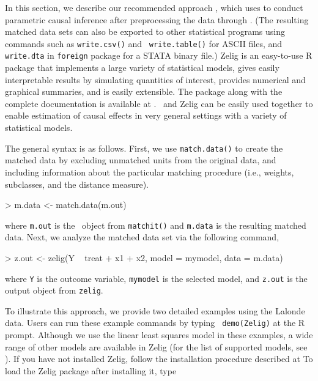 In this section, we describe our recommended approach
\citep{HoImaKin05}, which uses
 to conduct parametric
causal inference after preprocessing the data through \MatchIt.  (The
resulting matched data sets can also be exported to other statistical
programs using commands such as {\tt write.csv()} and {\tt
  write.table()} for ASCII files, and {\tt write.dta} in {\tt foreign}
package for a STATA binary file.)  Zelig \citep{ImaKinLau04} is an
easy-to-use R package that implements a large variety of statistical
models, gives easily interpretable results by simulating quantities of
interest, provides numerical and graphical summaries, and is easily
extensible.  The package along with the complete documentation is
available at
.
\MatchIt\ and Zelig can be easily used together to enable estimation
of causal effects in very general settings with a variety of
statistical models.

The general syntax is as follows. First, we use \texttt{match.data()}
to create the matched data by excluding unmatched units from the
original data, and including information about the particular matching
procedure (i.e., weights, subclasses, and the distance measure).
\begin{Schunk}
\begin{Sinput}
> m.data <- match.data(m.out)
\end{Sinput}
\end{Schunk}
where {\tt m.out} is the \MatchIt\ object from {\tt matchit()} and
{\tt m.data} is the resulting matched data.  Next, we analyze the
matched data set via the following command,
\begin{Schunk}
\begin{Sinput}
> z.out <- zelig(Y ~ treat + x1 + x2, model = mymodel, data = m.data)
\end{Sinput}
\end{Schunk}
where {\tt Y} is the outcome variable, {\tt mymodel} is the selected
model, and {\tt z.out} is the output object from {\tt zelig}.

To illustrate this approach, we provide two detailed examples using
the Lalonde data. Users can run these example commands by typing {\tt
  demo(Zelig)} at the R prompt. Although we use the linear least
squares model in these examples, a wide range of other models are
available in Zelig (for the list of supported models, see
).
If you have not installed Zelig, follow the installation procedure
described at
To load the Zelig package after installing it, type

